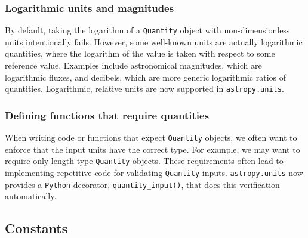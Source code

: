 \documentclass[modern]{aastex61}
\newcommand{\package}[1]{\texttt{#1}\xspace}
\newcommand{\python}{\package{Python}}
\newcommand{\astropypkg}{\package{astropy}}
\newcommand{\inlinecomment}[2]{\todo[inline]{#1: #2}\xspace}
\begin{document}


\subsubsection{Logarithmic units and magnitudes}
        By default, taking the logarithm of
        a \texttt{Quantity} object with non-dimensionless units intentionally
        fails.
        However, some well-known units are actually logarithmic quantities,
        where the logarithm of the value is taken with respect to some reference
        value.
        Examples include astronomical magnitudes, which are logarithmic fluxes,
        and decibels, which are more generic logarithmic ratios of quantities.
        Logarithmic, relative units are now supported in \texttt{astropy.units}.

\subsubsection{Defining functions that require quantities}
        When writing code or
        functions that expect \texttt{Quantity} objects, we often want to
        enforce that the input units have the correct type.
        For example, we may want to require only length-type \texttt{Quantity}
        objects.
        These requirements often lead to implementing repetitive code for
        validating \texttt{Quantity} inputs.
        \texttt{astropy.units} now provides a \python decorator,
        \texttt{quantity\_input()}, that does this verification automatically.


\subsection{Constants}
\end{document}

